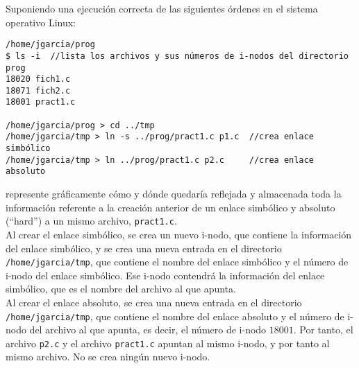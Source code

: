 \begin{ejercicio}
Suponiendo una ejecución correcta de las siguientes órdenes en el sistema operativo Linux:
\begin{verbatim}
/home/jgarcia/prog
$ ls -i  //lista los archivos y sus números de i-nodos del directorio prog
18020 fich1.c
18071 fich2.c
18001 pract1.c

/home/jgarcia/prog > cd ../tmp
/home/jgarcia/tmp > ln -s ../prog/pract1.c p1.c  //crea enlace simbólico
/home/jgarcia/tmp > ln ../prog/pract1.c p2.c     //crea enlace absoluto
\end{verbatim}
represente gráficamente cómo y dónde quedaría reflejada y almacenada toda la información referente a la creación anterior de un enlace simbólico y absoluto (``hard'') a un mismo archivo, \verb|pract1.c|.\\

    Al crear el enlace simbólico, se crea un nuevo i-nodo, que contiene la información del enlace simbólico,
    y se crea una nueva entrada en el directorio \verb|/home/jgarcia/tmp|, que contiene el nombre del enlace simbólico
    y el número de i-nodo del enlace simbólico. Ese i-nodo contendrá la información del enlace simbólico, que es
    el nombre del archivo al que apunta.\\

    Al crear el enlace absoluto, se crea una nueva entrada en el directorio \verb|/home/jgarcia/tmp|, que contiene
    el nombre del enlace absoluto y el número de i-nodo del archivo al que apunta, es decir, el número de i-nodo $18001$.
    Por tanto, el archivo \verb|p2.c| y el archivo \verb|pract1.c| apuntan al mismo i-nodo, y por tanto al mismo archivo.
    No se crea ningún nuevo i-nodo.
\end{ejercicio}

